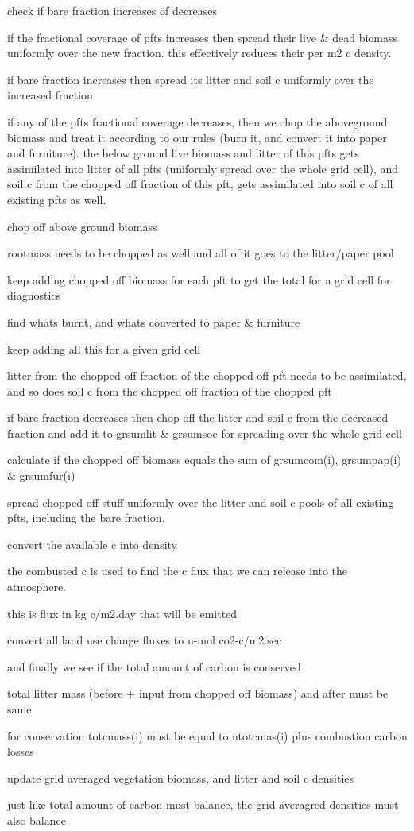 check if bare fraction increases of decreases

if the fractional coverage of pfts increases then spread their live \& dead biomass uniformly over the new fraction. this effectively reduces their per m2 c density.

if bare fraction increases then spread its litter and soil c uniformly over the increased fraction

if any of the pfts fractional coverage decreases, then we chop the aboveground biomass and treat it according to our rules (burn it, and convert it into paper and furniture). the below ground live biomass and litter of this pfts gets assimilated into litter of all pfts (uniformly spread over the whole grid cell), and soil c from the chopped off fraction of this pft, gets assimilated into soil c of all existing pfts as well.

chop off above ground biomass

rootmass needs to be chopped as well and all of it goes to the litter/paper pool

keep adding chopped off biomass for each pft to get the total for a grid cell for diagnostics

find what\textquotesingle{}s burnt, and what\textquotesingle{}s converted to paper \& furniture

keep adding all this for a given grid cell

litter from the chopped off fraction of the chopped off pft needs to be assimilated, and so does soil c from the chopped off fraction of the chopped pft

if bare fraction decreases then chop off the litter and soil c from the decreased fraction and add it to grsumlit \& grsumsoc for spreading over the whole grid cell

calculate if the chopped off biomass equals the sum of grsumcom(i), grsumpap(i) \& grsumfur(i)

spread chopped off stuff uniformly over the litter and soil c pools of all existing pfts, including the bare fraction.

convert the available c into density

the combusted c is used to find the c flux that we can release into the atmosphere.

this is flux in kg c/m2.\+day that will be emitted

convert all land use change fluxes to u-\/mol co2-\/c/m2.\+sec

and finally we see if the total amount of carbon is conserved

total litter mass (before + input from chopped off biomass) and after must be same

for conservation totcmass(i) must be equal to ntotcmas(i) plus combustion carbon losses

update grid averaged vegetation biomass, and litter and soil c densities

just like total amount of carbon must balance, the grid averagred densities must also balance